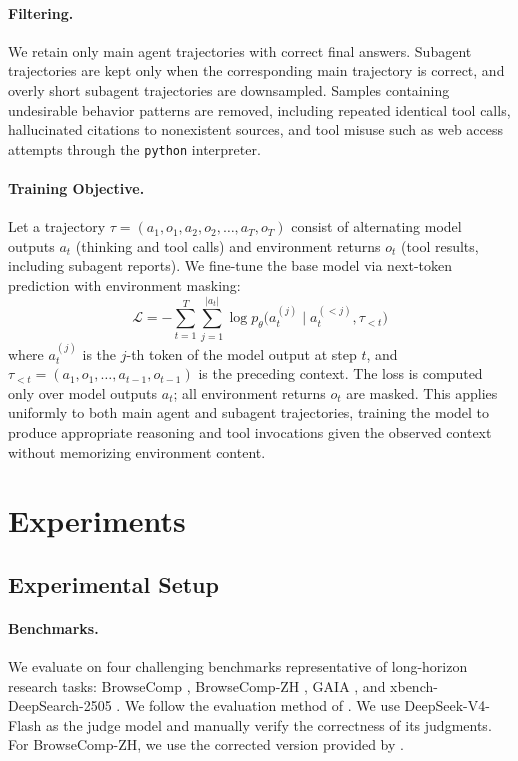 \documentclass[table]{gtech}
\begin{document}
\paragraph{Filtering.}
We retain only main agent trajectories with correct final answers. Subagent trajectories are kept only when the corresponding main trajectory is correct, and overly short subagent trajectories are downsampled. Samples containing undesirable behavior patterns are removed, including repeated identical tool calls, hallucinated citations to nonexistent sources, and tool misuse such as web access attempts through the \texttt{python} interpreter.

\paragraph{Training Objective.}
Let a trajectory $\tau = (a_1, o_1, a_2, o_2, \ldots, a_T, o_T)$ consist of alternating model outputs $a_t$ (thinking and tool calls) and environment returns $o_t$ (tool results, including subagent reports). We fine-tune the base model via next-token prediction with environment masking:
\begin{equation}
\mathcal{L} = -\sum_{t=1}^{T} \sum_{j=1}^{|a_t|} \log p_\theta\bigl(a_t^{(j)} \mid a_t^{(<j)}, \tau_{<t}\bigr)
\end{equation}
where $a_t^{(j)}$ is the $j$-th token of the model output at step $t$, and $\tau_{<t} = (a_1, o_1, \ldots, a_{t-1}, o_{t-1})$ is the preceding context. The loss is computed only over model outputs $a_t$; all environment returns $o_t$ are masked. This applies uniformly to both main agent and subagent trajectories, training the model to produce appropriate reasoning and tool invocations given the observed context without memorizing environment content.
\section{Experiments}
\label{sec:experiments}

\subsection{Experimental Setup}

\paragraph{Benchmarks.}
We evaluate on four challenging benchmarks representative of long-horizon research tasks: BrowseComp \citep{wei2025browsecomp}, BrowseComp-ZH \citep{zhou2025browsecomp}, GAIA \citep{mialon2024gaia}, and xbench-DeepSearch-2505 \citep{xbench2025}. We follow the evaluation method of \citet{team2026mirothinker}. We use DeepSeek-V4-Flash as the judge model and manually verify the correctness of its judgments. For BrowseComp-ZH, we use the corrected version provided by \citet{team2026longcat}.
\end{document}
